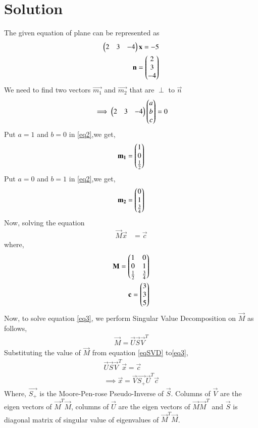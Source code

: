 \documentclass[journal,12pt,twocolumn]{IEEEtran}
\begin{document}
\section{Solution}
The given equation of plane can be represented as
\begin{align}
    \myvec{2 & 3 & -4}\Vec{x}=-5\label{eq1}\\
    \vec{n}=\myvec{2\\3\\-4}
\end{align}
We need to find two vectors $\vec{m_1}$ and $\Vec{m_2}$ that are $\perp$ to $\vec{n}$
\begin{align}\label{eq2}
	\implies\begin{pmatrix}2 & 3 & -4\end{pmatrix}\begin{pmatrix}a\\b\\c\end{pmatrix} = 0
\end{align}
Put $a=1$ and $b=0$ in \eqref{eq2},we get,
\begin{align}
    \Vec{m_1}=\myvec{1\\0\\\frac{1}{2}}
\end{align}
Put $a=0$ and $b=1$ in \eqref{eq2},we get,
\begin{align}
    \Vec{m_2}=\myvec{0\\1\\\frac{3}{4}}
\end{align}
Now, solving the equation
\begin{align}
	\label{eq3}\vec{M}\Vec{x} &= \vec{c}
\end{align}
where,
\begin{align}
\Vec{M}=\myvec{1&0\\0&1\\\frac{1}{2}&\frac{3}{4}}&\\
    \vec{c}=\myvec{3\\3\\5}&
\end{align}
Now, to solve equation \eqref{eq3}, we perform Singular Value Decomposition on $\vec{M}$ as follows,
\begin{align}
\vec{M}=\vec{U}\vec{S}\vec{V}^T\label{eqSVD}
\end{align}
Substituting the value of $\Vec{M}$ from equation \eqref{eqSVD} to\eqref{eq3},
\begin{align}
    \vec{U}\vec{S}\vec{V}^T\Vec{x}=\vec{c}\\
    \implies \vec{x}=\vec{V}\vec{S_+}\vec{U}^T\Vec{c} \label{eqX}
\end{align}
Where, $\Vec{S_+}$ is the Moore-Pen-rose Pseudo-Inverse of $\Vec{S}$. Columns of $\vec{V}$ are the eigen vectors of $\vec{M}^T\vec{M}$, columns of $\vec{U}$ are the eigen vectors of $\vec{M}\vec{M}^T$ and $\vec{S}$ is diagonal matrix of singular value of eigenvalues of $\vec{M}^T\vec{M}$.
\end{document}
